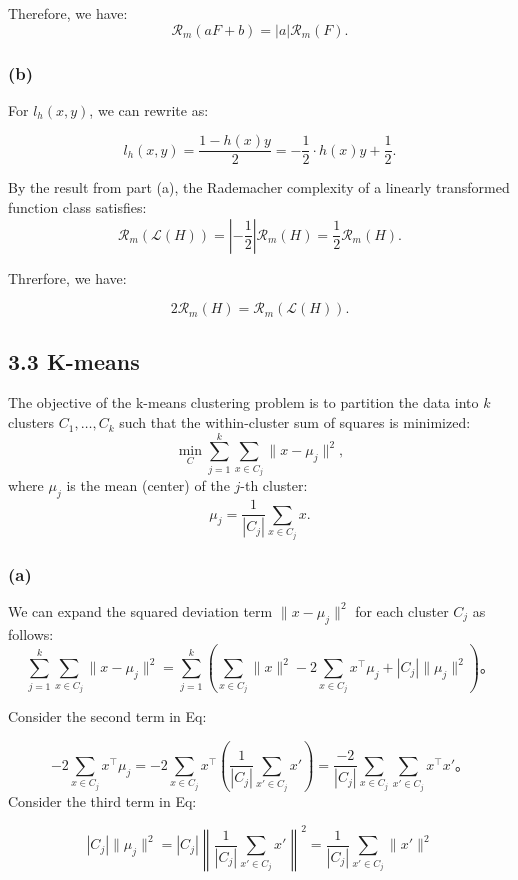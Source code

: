 \documentclass[12pt]{article}
\begin{document}
Therefore, we have:
\[
\mathcal{R}_m(aF + b) = |a| \mathcal{R}_m(F).
\]

\subsubsection*{(b)}

For \( l_h(x, y) \), we can rewrite as:

\[
l_h(x, y) = \frac{1 - h(x)y}{2} = -\frac{1}{2} \cdot h(x)y + \frac{1}{2}.
\]

By the result from part (a), the Rademacher complexity of a linearly transformed function class satisfies:
\[
\mathcal{R}_m(\mathcal{L}(H)) = \left| -\frac{1}{2} \right| \mathcal{R}_m(H) = \frac{1}{2} \mathcal{R}_m(H).
\]

Threrfore, we have:

\[
2 \mathcal{R}_m(H) = \mathcal{R}_m(\mathcal{L}(H)).
\]

\subsection*{3.3 K-means}

The objective of the k-means clustering problem is to partition the data into \( k \) clusters \( C_1, \dots, C_k \) such that the within-cluster sum of squares is minimized:
\[
\min_{C} \sum_{j=1}^k \sum_{x \in C_j} \| x - \mu_j \|^2,
\]
where \( \mu_j \) is the mean (center) of the \( j \)-th cluster:
\[
\mu_j = \frac{1}{|C_j|} \sum_{x \in C_j} x.
\]

\subsubsection*{(a)}

We can expand the squared deviation term \( \| x - \mu_j \|^2 \) for each cluster \( C_j \) as follows:
\[
\sum_{j=1}^k \sum_{x \in C_j} \| x - \mu_j \|^2 = \sum_{j=1}^k \left( \sum_{x \in C_j} \| x \|^2 - 2 \sum_{x \in C_j} x^\top \mu_j + |C_j| \| \mu_j \|^2 \right)。
\]


Consider the second term in Eq:

\[
-2 \sum_{x \in C_j} x^\top \mu_j = -2 \sum_{x \in C_j} x^\top \left( \frac{1}{|C_j|} \sum_{x' \in C_j} x' \right) = \frac{-2}{|C_j|} \sum_{x \in C_j} \sum_{x' \in C_j} x^\top x'。
\]
Consider the third term in Eq:

\[
|C_j| \| \mu_j \|^2 = |C_j| \left\| \frac{1}{|C_j|} \sum_{x' \in C_j} x' \right\|^2 = \frac{1}{|C_j|} \sum_{x' \in C_j} \|x' \|^2
\]
\end{document}
